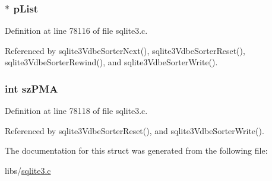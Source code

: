 \hypertarget{struct_sorter_list_a381073bea893f4394ec3ae3a8a6a88d9}{}
\subsubsection[{p\+List}]{$\ast$ p\+List}\label{struct_sorter_list_a381073bea893f4394ec3ae3a8a6a88d9}


Definition at line 78116 of file sqlite3.\+c.



Referenced by sqlite3\+Vdbe\+Sorter\+Next(), sqlite3\+Vdbe\+Sorter\+Reset(), sqlite3\+Vdbe\+Sorter\+Rewind(), and sqlite3\+Vdbe\+Sorter\+Write().

\hypertarget{struct_sorter_list_a842a50350f36586dc944049b73ffdccd}{}
\subsubsection[{sz\+P\+M\+A}]{\setlength{\rightskip}{0pt plus 5cm}int sz\+P\+M\+A}\label{struct_sorter_list_a842a50350f36586dc944049b73ffdccd}


Definition at line 78118 of file sqlite3.\+c.



Referenced by sqlite3\+Vdbe\+Sorter\+Reset(), and sqlite3\+Vdbe\+Sorter\+Write().



The documentation for this struct was generated from the following file\+:\begin{DoxyCompactItemize}
\item 
libs/\hyperlink{sqlite3_8c}{sqlite3.\+c}\end{DoxyCompactItemize}
